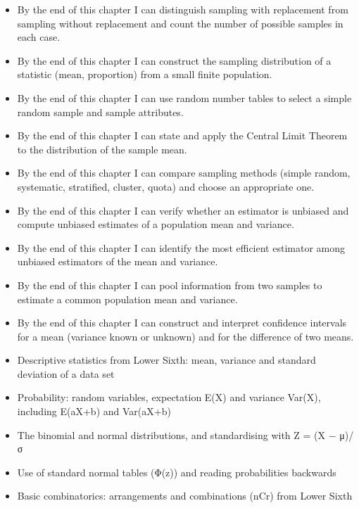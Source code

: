 \documentclass[11pt]{article}
\begin{document}
\begin{objectifs}
\begin{itemize}
\item By the end of this chapter I can distinguish sampling with replacement from sampling without replacement and count the number of possible samples in each case.
\item By the end of this chapter I can construct the sampling distribution of a statistic (mean, proportion) from a small finite population.
\item By the end of this chapter I can use random number tables to select a simple random sample and sample attributes.
\item By the end of this chapter I can state and apply the Central Limit Theorem to the distribution of the sample mean.
\item By the end of this chapter I can compare sampling methods (simple random, systematic, stratified, cluster, quota) and choose an appropriate one.
\item By the end of this chapter I can verify whether an estimator is unbiased and compute unbiased estimates of a population mean and variance.
\item By the end of this chapter I can identify the most efficient estimator among unbiased estimators of the mean and variance.
\item By the end of this chapter I can pool information from two samples to estimate a common population mean and variance.
\item By the end of this chapter I can construct and interpret confidence intervals for a mean (variance known or unknown) and for the difference of two means.
\end{itemize}
\end{objectifs}

\begin{prerequis}
\begin{itemize}
\item Descriptive statistics from Lower Sixth: mean, variance and standard deviation of a data set
\item Probability: random variables, expectation E(X) and variance Var(X), including E(aX+b) and Var(aX+b)
\item The binomial and normal distributions, and standardising with Z = (X − μ)/σ
\item Use of standard normal tables (Φ(z)) and reading probabilities backwards
\item Basic combinatorics: arrangements and combinations (nCr) from Lower Sixth
\end{itemize}
\end{prerequis}
\end{document}
